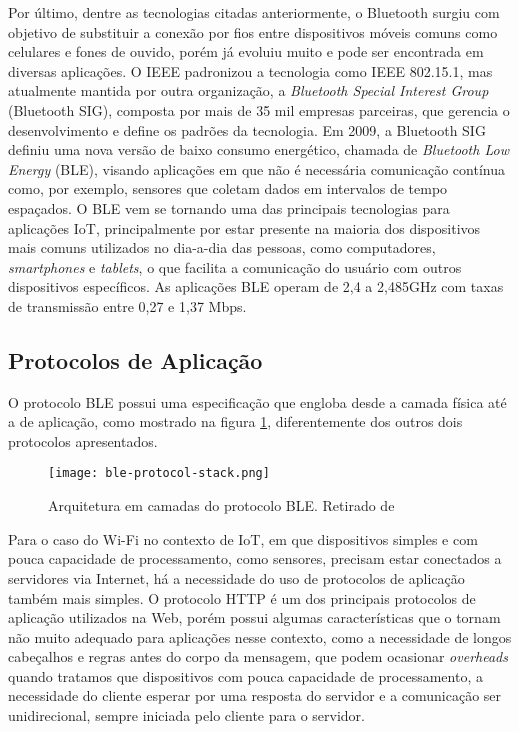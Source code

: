 \documentclass[../monografia.tex]{subfiles}
\begin{document}
Por último, dentre as tecnologias citadas anteriormente, o Bluetooth surgiu com objetivo de substituir a conexão por fios entre dispositivos móveis comuns como celulares e fones de ouvido, porém já evoluiu muito e pode ser encontrada em diversas aplicações. O IEEE padronizou a tecnologia como IEEE 802.15.1, mas atualmente mantida por outra organização, a \textit{Bluetooth Special Interest Group} (Bluetooth SIG), composta por mais de 35 mil empresas parceiras, que gerencia o desenvolvimento e define os padrões da tecnologia. Em 2009, a Bluetooth SIG definiu uma nova versão de baixo consumo energético, chamada de \textit{Bluetooth Low Energy} (BLE), visando aplicações em que não é necessária comunicação contínua como, por exemplo, sensores que coletam dados em intervalos de tempo espaçados. O BLE vem se tornando uma das principais tecnologias para aplicações IoT, principalmente por estar presente na maioria dos dispositivos mais comuns utilizados no dia-a-dia das pessoas, como computadores, \textit{smartphones} e \textit{tablets}, o que facilita a comunicação do usuário com outros dispositivos específicos. As aplicações BLE operam de 2,4 a 2,485GHz com taxas de transmissão entre 0,27 e 1,37 Mbps\cite{ble-datarate}. 

\subsection{Protocolos de Aplicação} \label{protocolos-aplicacao}

O protocolo BLE possui uma especificação que engloba desde a camada física até a de aplicação, como mostrado na figura \ref{fig:ble-stack}, diferentemente dos outros dois protocolos apresentados. 

\begin{figure}[h]
\centering
\texttt{[image: ble-protocol-stack.png]}
\caption{Arquitetura em camadas do protocolo BLE. Retirado de \cite{ble-protocol-stack}}
\label{fig:ble-stack}
\end{figure}

Para o caso do Wi-Fi no contexto de IoT, em que dispositivos simples e com pouca capacidade de processamento, como sensores, precisam estar conectados a servidores via Internet, há a necessidade do uso  de protocolos de aplicação também mais simples. O protocolo HTTP é um dos principais protocolos de aplicação utilizados na Web, porém possui algumas características que o tornam não muito adequado para aplicações nesse contexto, como a necessidade de longos cabeçalhos e regras antes do corpo da mensagem, que podem ocasionar \textit{overheads} quando tratamos que dispositivos com pouca capacidade de processamento, a necessidade do cliente esperar por uma resposta do servidor e a comunicação ser unidirecional, sempre iniciada pelo cliente para o servidor.
\end{document}
